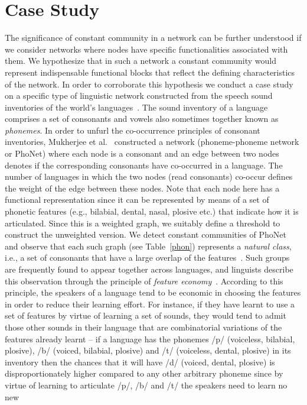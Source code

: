 \section{Case Study} The significance of constant community in a network can be further understood if we consider networks where
nodes have specific functionalities associated with them. We hypothesize
that
in such a network a constant community would represent indispensable functional blocks that reflect the defining characteristics of the
network. In order to corroborate this hypothesis we conduct a case study on a specific type of linguistic network constructed from the
speech sound inventories of the world's languages~\cite{pho}. The sound inventory of a language comprises a set of consonants and vowels
also
sometimes together known as {\em phonemes}. In order to unfurl the co-occurrence principles of consonant inventories, Mukherjee
et al.~\cite{pho}
constructed a network (phoneme-phoneme network or PhoNet) where each node is a consonant and an edge between two nodes denotes if the
corresponding consonants have co-occurred in a language. The number of languages in which the two nodes (read consonants) co-occur defines
the
weight of the edge between these nodes. Note that each node here has a functional representation since it can be represented by means of
a set of phonetic features (e.g., bilabial, dental, nasal, plosive etc.) that indicate how it is articulated. Since this is a weighted
graph, we suitably define a threshold to construct the unweighted version. We detect constant communities of PhoNet and observe that each
such graph (see Table~\ref{phon}) represents a {\em natural class}, i.e., a set of consonants that have a large overlap of the
features~\cite{pho}. Such groups are frequently found to appear together across languages, and linguists describe this observation through
the principle of {\em feature economy}~\cite{pho}. According to this principle, the speakers of a language tend to be economic in choosing
the features in order to reduce their learning effort. For instance, if they have learnt to use a set of features by virtue of learning a
set of sounds, they would tend to admit those other sounds in their language that are combinatorial variations of the features already
learnt -- if a language has the phonemes /p/ (voiceless, bilabial, plosive), /b/ (voiced, bilabial, plosive) and /t/
(voiceless, dental, plosive) in its inventory then the chances that it will have /d/ (voiced, dental, plosive) is disproportionately
higher compared to any other arbitrary phoneme since by virtue of learning to articulate /p/, /b/ and /t/ the speakers need to learn no new
